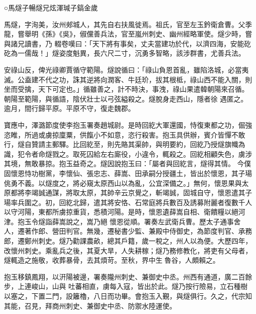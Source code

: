 
\begin{pinyinscope}

 ○馬燧子暢燧兄炫渾瑊子鎬金歲



 馬燧，字洵美，汝州郟城人，其先自右扶風徙焉。祖氏，官至左玉鈐衛倉曹。父季龍，嘗舉明《孫》《吳》，俶儻善兵法，官至嵐州刺史、幽州經略軍使。燧少時，嘗與諸兄讀書，乃
 輟卷嘆曰：「天下將有事矣，丈夫當建功於代，以濟四海，安能矻矻為一儒哉！」燧姿度魁異，長六尺二寸，沉勇多智略，該涉群書，尤善兵法。



 安祿山反，俾光祿卿賈循守範陽。燧說循曰：「祿山負恩首亂，雖陷洛城，必當夷滅。公盍建不代之功，誅其逆將向潤客、牛廷玠，拔其根柢，祿山西不能入關，則坐而受擒，天下可定也。」循雖善之，計不時決，事洩，祿山果遣韓朝陽來召循。朝陽至範陽，與循語，陰伏壯士以弓弦縊殺之。燧脫身走西山，隱者徐
 遇匿之。逾月，間行歸平原。平原不守，復走魏郡。



 寶應中，澤潞節度使李抱玉署奏趙城尉。是時回紇大軍還國，恃復東都之功，倔強恣睢，所過或虜掠廩粟，供餼小不如意，恣行殺害。抱玉具供辦，賓介皆憚不敢行，燧自贊請主郵驛。比回紇至，則先賂其渠帥，與明要約，回紇乃授燧旗幟為識，犯令者命燧戮之。取死囚給左右廝役，小違令，輒殺之。回紇相顧失色，虜涉其境，無敢暴掠。抱玉益奇之。燧因說抱玉曰：「屬者與回紇言，燧得其情。
 今僕固懷恩恃功樹黨，李懷仙、張忠志、薛嵩、田承嗣分授疆土，皆出於懷恩，其子瑒佻勇不義。以燧度之，將必窺太原西山以為亂，公宜深備之。」無何，懷恩果與太原都將李竭誠通謀，將取太原，其帥辛云京覺之，斬竭誠，固城自守，懷恩遣其子瑒率兵圍之。初，回紇北歸，遣其將安恪、石常庭將兵數百及誘募附麗者復數千人以守河陽，東都所虜掠重貨，悉積河陽。是時，懷恩遺薛嵩自相、衛饋糧以絕河津。抱玉令燧詣薛嵩說之，嵩乃絕
 懷恩從順。署奏左武衛兵曹。歷太子通事舍人，遷著作郎、營田判官。無幾，遷秘書少監、兼殿中侍御史，為節度判官、承務郎，遷鄭州刺史。燧乃勸課農畝，總其戶籍，歲一稅之，州人以為便。大歷四年，改懷州刺史。乘亂兵之後，其夏大旱，人失耕稼；燧乃務修教化，將吏有父母者，燧輒造之施敬，收葬暴骨，去其煩苛。至秋，界中生魯谷，人頗賴之。



 抱玉移鎮鳳翔，以汧陽被邊，署奏隴州刺史、兼御史中丞。州西有通道，廣二百餘步，上連峻山，山與
 吐蕃相直，虜每入寇，皆出於此。燧乃按行險易，立石種樹以塞之，下置二門，設籬櫓，八日而功畢。會抱玉入覲，與燧俱行。久之，代宗知其能，召見，拜商州刺史、兼御史中丞、防禦水陸運使。




\end{pinyinscope}
